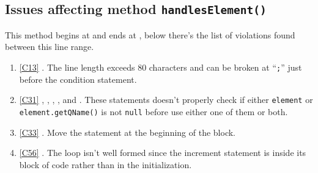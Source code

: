 \subsection{Issues affecting method \texttt{handlesElement()}}
This method begins at  and ends at , below there's the list of violations found between this line range.
\begin{enumerate}
	\item \ref{C13} . The line length exceeds 80 characters and can be broken at ``\texttt{;}'' just before the condition statement. 	
	\item \ref{C31} , , , ,  and . These statements doesn't properly check if either \texttt{element} or \texttt{element.getQName()} is not \texttt{null} before use either one of them or both.
	\item \ref{C33} . Move the statement at the beginning of the block.
	\item \ref{C56} . The loop isn't well formed since the increment statement is inside its block of code rather than in the initialization. 
\end{enumerate}

